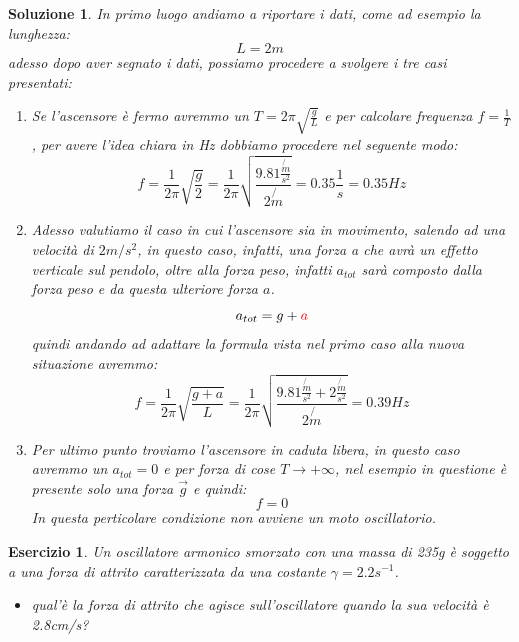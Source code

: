 \documentclass{article}
\newtheorem{es}{Esercizio}[section]
\newtheorem{sol}{Soluzione}[section]
\begin{document}
\begin{sol}
  In primo luogo andiamo a riportare i dati, come ad esempio la lunghezza:
  \begin{equation*}
    L=2m
  \end{equation*}
  adesso dopo aver segnato i dati, possiamo procedere a svolgere i tre casi presentati:
  \begin{enumerate}
  \item Se l'ascensore è fermo avremmo un $T=2\pi \sqrt{\frac{g}{L}}$ e per calcolare frequenza $f=\frac{1}{T}$, per avere l'idea chiara in Hz dobbiamo procedere nel seguente modo:
    \begin{equation*}
      f=\frac{1}{2\pi}\sqrt{\frac{g}{2}}=\frac{1}{2\pi}\sqrt{\frac{9.81\frac{\not{m}}{s^2}}{2\not{m}}}=0.35\frac{1}{s}=0.35Hz
    \end{equation*}
    
  \item Adesso valutiamo il caso in cui l'ascensore sia in movimento, salendo ad una velocità di $2m/s^2$, in questo caso, infatti, una forza a che avrà un effetto verticale sul pendolo, oltre alla forza peso, infatti $a_{tot}$ sarà composto dalla forza peso e da questa ulteriore forza $a$.
    \begin{equation*}
      a_{tot}=g+{\color{red}a}
    \end{equation*}
    quindi andando ad adattare la formula vista nel primo caso alla nuova situazione avremmo:
    \begin{equation*}
      f=\frac{1}{2\pi}\sqrt{\frac{g+a}{L}}=\frac{1}{2\pi}\sqrt{\frac{9.81\frac{\not{m}}{s^2}+2\frac{\not{m}}{s^2}}{2\not{m}}}=0.39Hz
    \end{equation*}
  \item Per ultimo punto troviamo l'ascensore in caduta libera, in questo caso avremmo un $a_{tot}= 0$ e per forza di cose $T\to +\infty$, nel esempio in questione è presente solo una forza $\vec{g}$ e quindi:
    \begin{equation*}
      f=0
    \end{equation*}
    In questa perticolare condizione non avviene un moto oscillatorio.
  \end{enumerate}
\end{sol}
\begin{es}
  Un oscillatore armonico smorzato con una massa di 235g è soggetto a una forza di attrito caratterizzata da una costante $\gamma=2.2s^{-1}$.
  \begin{itemize}
  \item qual'è la forza di attrito che agisce sull'oscillatore quando la sua velocità è 2.8cm/s?
  \end{itemize}
\end{es}
\end{document}
